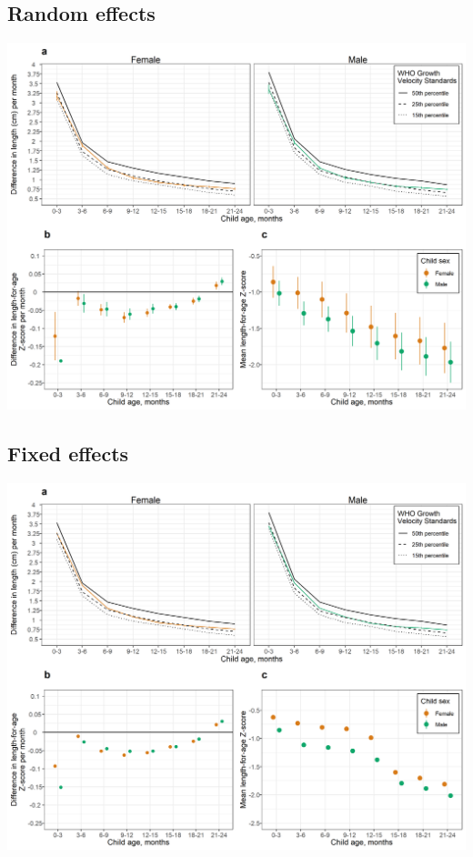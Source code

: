 \documentclass[9pt,]{book}
\begin{document}
\hypertarget{random-effects-3}{%
\subsection{Random effects}\label{random-effects-3}}

\includegraphics[width=41.67in]{figure-copies/fig-stunt-2-vel-overall--allage-primary}

\hypertarget{fixed-effects-4}{%
\subsection{Fixed effects}\label{fixed-effects-4}}

\includegraphics[width=41.67in]{figure-copies/fig-stunt-2-vel-overall--allage-fe}
\end{document}
